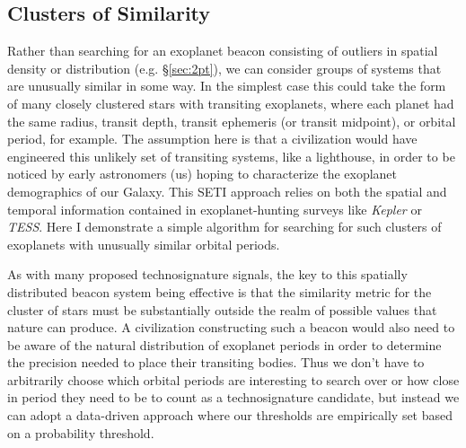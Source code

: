 \documentclass[twocolumn]{aastex62}
\newcommand{\Kepler}{\textsl{Kepler}\xspace}
\newcommand{\TESS}{\textsl{TESS}\xspace}
\begin{document}
\subsection{Clusters of Similarity}

Rather than searching for an exoplanet beacon consisting of outliers in spatial density or distribution (e.g. \S\ref{sec:2pt}), we can consider groups of systems that are unusually similar in some way. In the simplest case this could take the form of many closely clustered stars with transiting exoplanets, where each planet had the same radius, transit depth, transit ephemeris (or transit midpoint), or orbital period, for example. The assumption here is that a civilization would have engineered this unlikely set of transiting systems, like a lighthouse, in order to be noticed by early astronomers (us) hoping to characterize the exoplanet demographics of our Galaxy. This SETI approach relies on both the spatial and temporal information contained in exoplanet-hunting surveys like \Kepler or \TESS.
Here I demonstrate a simple algorithm for searching for such clusters of exoplanets with unusually similar orbital periods.



As with many proposed technosignature signals, the key to this spatially distributed beacon system being effective is that the similarity metric for the cluster of stars must be substantially outside the realm of possible values that nature can produce. A civilization constructing such a beacon would also need to be aware of the natural distribution of exoplanet periods in order to determine the precision needed to place their transiting bodies. Thus we don't have to arbitrarily choose which orbital periods are interesting to search over or how close in period they need to be to count as a technosignature candidate, but instead we can adopt a data-driven approach where our thresholds are empirically set based on a probability threshold. 
\end{document}
